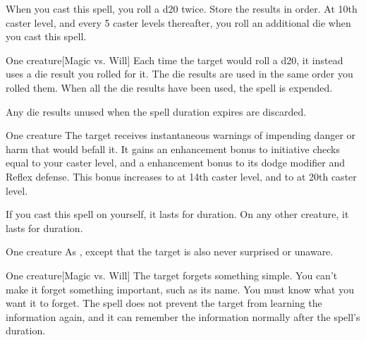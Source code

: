 \spellrng{\rngmed}
\spellspecial When you cast this spell, you roll a d20 twice. Store the results in order. At 10th caster level, and every 5 caster levels thereafter, you roll an additional die when you cast this spell.
\begin{spelltarget}{One creature}[Magic vs. Will]
    \spellsuccess Each time the target would roll a d20, it instead uses a die result you rolled for it. The die results are used in the same order you rolled them. When all the die results have been used, the spell is expended.
\end{spelltarget}
\spellnotes Any die results unused when the spell duration expires are discarded.

\begin{spelltarget}{One creature}
    \spelleffect The target receives instantaneous warnings of impending danger or harm that would befall it. It gains an enhancement bonus to initiative checks equal to your caster level, and a  enhancement bonus to its dodge modifier and Reflex defense. This bonus increases to  at 14th caster level, and to  at 20th caster level.
    \par If you cast this spell on yourself, it lasts for \durlong duration. On any other creature, it lasts for \durshort duration.
\end{spelltarget}

\begin{spelltarget}{One creature}
    \spelleffect As , except that the target is also never surprised or unaware.
\end{spelltarget}

\spellrng{\rngmed}
\spelldur{\durlong}
\begin{spelltarget}{One creature}[Magic vs. Will]
    \spelleffect The target forgets something simple. You can't make it forget something important, such as its name. You must know what you want it to forget. The spell does not prevent the target from learning the information again, and it can remember the information normally after the spell's duration.
\end{spelltarget}

